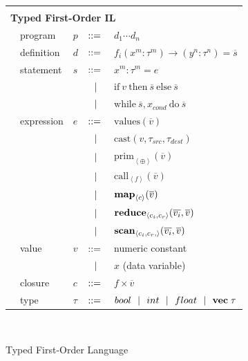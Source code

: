 \documentclass[preprint]{sigplanconf}
\begin{document}
\begin{figure}[h!]
  \begin{tabular}{| m{0.01cm}m{1.3cm}m{0.1cm}m{0.2cm}p{5.0cm} |}
  \hline
    & & & &\\
   \multicolumn{5}{|l|}{\textbf{Typed First-Order IL}}  \\[4pt]
  & program & $p$ &  $::=$   &  $d_1 \cdots d_n $ \\[4pt]
  & definition & $d$ & $::=$ & $f_i(x^m : \tau^m) \rightarrow (y^n : \tau^n) = \overline{s} $ \\[4pt]
  & statement  & $s$ & $::=$ & $x^m : \tau^m = e $\\[2pt]
  &            &     & $\ \ | \ \ $    & $\mathrm{if} ~v~ \mathrm{then} ~\overline{s}~ \mathrm{else} ~ \overline{s}$ \\[2pt]
  &            &     & $\ \ | \ \ $    & $\mathrm{while} ~ \overline{s}, x_{cond} ~ \mathrm{do} ~ \overline{s} ~  $ \\[4pt]
  & expression & $e$ & $::=$ & $\mathrm{values}(\overline{v})$ \\[2pt]
  &            &     & $\ \ | \ \ $    & $\mathrm{cast} (v, \tau_{src}, \tau_{dest})$ \\[2pt]
  &            &     & $\ \ | \ \ $    & $\mathrm{prim}_{\left\langle \oplus \right\rangle }(\overline{v})$ \\[2pt]
  &            &     & $\ \ | \ \ $    & $\mathrm{call}_{\left\langle f  \right\rangle } (\overline{v})$ \\[2pt] 
  
  &            &     & $\ \ | \ \ $    & $\mbox{\textbf{map}} _{\left\langle c \right\rangle}(\overline{v})$ \\[2pt]
  &            &     & $\ \ | \ \ $    & $\mbox{\textbf{reduce}} _{ \left\langle c_i, c_r \right\rangle } (\overline{v_i}, \overline{v})$ \\[2pt]
  &            &     & $\ \ | \ \ $    & $\mbox{\textbf{scan}} _{ \left\langle c_i, c_r, \right\rangle} (\overline{v_i}, \overline{v})$ \\[5pt]
  & value      & $v$ & $::=$ & numeric constant \\[2pt]
  &            &     & $\ \ | \ \ $    &  $x$  \quad \small{(data variable)} \\[2pt]
  & closure    & $c$ & $::=$ & $f \times \overline{v}$ \\[4pt]
  & type & $\tau$    & $::=$ & $bool \ \ | \ \  int \ \ | \ \  float \ \ | \ \  \mathbf{vec} \; \tau   $\\[5pt]
  \hline
  \end{tabular}\\[4pt]
  \caption{Typed First-Order Language}
  \label{TIL}
\end{figure} 
\end{document}
